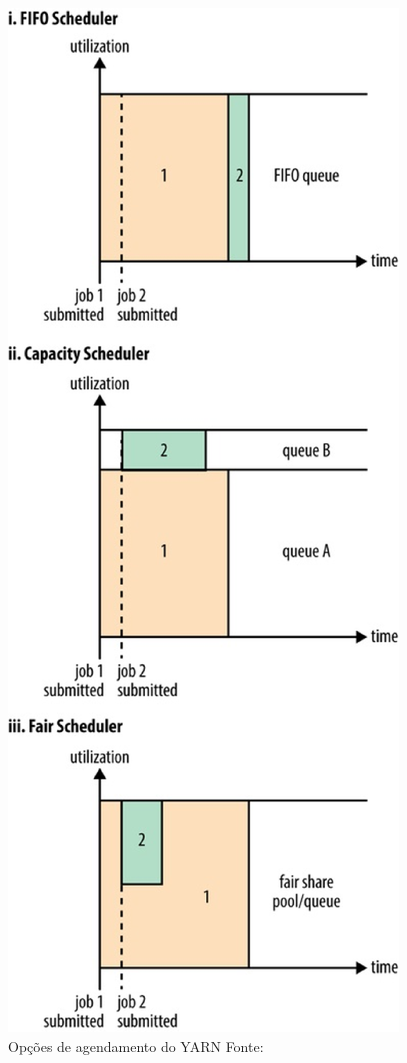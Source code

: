                 \begin{figure}[ht!]
                        \centering
                        \includegraphics[keepaspectratio=true,scale=0.30]
                            {figuras/figura8.eps}
                        \caption[Opções de agendamento do YARN]{Opções de agendamento do YARN
                        \protect \linebreak Fonte: }
                        \label{figura8}
                 \end{figure}





